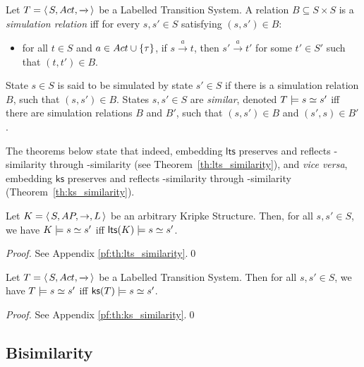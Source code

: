 \documentclass{llncs}
\newcommand{\ltstrans}[1]{\xrightarrow{#1}}
\newcommand{\kstrans}{\to}
\newcommand{\lts}{\mathsf{lts}}
\newcommand{\ks}{\mathsf{ks}}
\begin{document}
\begin{definition} Let $T = \tuple{S, \act, \ltstrans{}}$ be a Labelled
Transition System. A relation $B \subseteq S \times S$ is a
\emph{simulation relation} iff for every $s,s' \in S$ satisfying
$(s,s') \in B$:
\begin{itemize}
\item for all $t \in S$ and $a \in Act \cup \{\tau\}$,
if $s \ltstrans{a} t$, then $s' \ltstrans{a} t'$
for some $t' \in S'$ such that $(t,t') \in B$.

\end{itemize}
State $s \in S$ is said to be simulated by state $s' \in S$ if there is
a simulation relation $B$, such that $(s,s') \in B$. States $s,s' \in S$
are \emph{similar}, denoted
$T \models s \simeq s'$ iff there are simulation relations $B$ and $B'$, such
that $(s,s') \in B$ and $(s',s) \in B'$.

\end{definition}

The theorems below state that indeed, embedding $\lts$ preserves
and reflects \KS-similarity through \LTS-similarity (see
Theorem~\ref{th:lts_similarity}), and \emph{vice versa}, embedding
$\ks$ preserves and reflects \LTS-similarity through \KS-similarity
(Theorem~\ref{th:ks_similarity}).

\begin{theorem}
\label{th:lts_similarity}
Let $K = \tuple{S, \AP,\kstrans, L}$ be an arbitrary Kripke Structure.
Then, for all $s, s' \in S$, we have
$K \models s \simeq s'$ iff $\lts(K) \models s \simm s'$.
\end{theorem}

\begin{proof}
See Appendix \ref{pf:th:lts_similarity}.\qed
\end{proof}

\begin{theorem}
\label{th:ks_similarity}
Let $T = \tuple{S, \act, \ltstrans{}}$ be a Labelled Transition System.
Then for all $s,s' \in S$, we have $T \models s \simeq s'$ iff
$\ks(T) \models s \simm s'$.
\end{theorem}

\begin{proof}
See Appendix \ref{pf:th:ks_similarity}.\qed
\end{proof}

\subsection{Bisimilarity}
\label{sec:bisimilarity}
\end{document}
